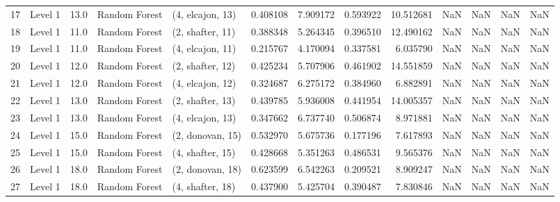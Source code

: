 \begin{tabular}{llrllrrrrrrrr}
17 &   Level 1 &   13.0 &  Random Forest &  (4, elcajon, 13) &   0.408108 &   7.909172 &  0.593922 &  10.512681 &                  NaN &                    NaN &                 NaN &                   NaN \\
18 &   Level 1 &   11.0 &  Random Forest &  (2, shafter, 11) &   0.388348 &   5.264345 &  0.396510 &  12.490162 &                  NaN &                    NaN &                 NaN &                   NaN \\
19 &   Level 1 &   11.0 &  Random Forest &  (4, elcajon, 11) &   0.215767 &   4.170094 &  0.337581 &   6.035790 &                  NaN &                    NaN &                 NaN &                   NaN \\
20 &   Level 1 &   12.0 &  Random Forest &  (2, shafter, 12) &   0.425234 &   5.707906 &  0.461902 &  14.551859 &                  NaN &                    NaN &                 NaN &                   NaN \\
21 &   Level 1 &   12.0 &  Random Forest &  (4, elcajon, 12) &   0.324687 &   6.275172 &  0.384960 &   6.882891 &                  NaN &                    NaN &                 NaN &                   NaN \\
22 &   Level 1 &   13.0 &  Random Forest &  (2, shafter, 13) &   0.439785 &   5.936008 &  0.441954 &  14.005357 &                  NaN &                    NaN &                 NaN &                   NaN \\
23 &   Level 1 &   13.0 &  Random Forest &  (4, elcajon, 13) &   0.347662 &   6.737740 &  0.506874 &   8.971881 &                  NaN &                    NaN &                 NaN &                   NaN \\
24 &   Level 1 &   15.0 &  Random Forest &  (2, donovan, 15) &   0.532970 &   5.675736 &  0.177196 &   7.617893 &                  NaN &                    NaN &                 NaN &                   NaN \\
25 &   Level 1 &   15.0 &  Random Forest &  (4, shafter, 15) &   0.428668 &   5.351263 &  0.486531 &   9.565376 &                  NaN &                    NaN &                 NaN &                   NaN \\
26 &   Level 1 &   18.0 &  Random Forest &  (2, donovan, 18) &   0.623599 &   6.542263 &  0.209521 &   8.909247 &                  NaN &                    NaN &                 NaN &                   NaN \\
27 &   Level 1 &   18.0 &  Random Forest &  (4, shafter, 18) &   0.437900 &   5.425704 &  0.390487 &   7.830846 &                  NaN &                    NaN &                 NaN &                   NaN \\

\end{tabular}
